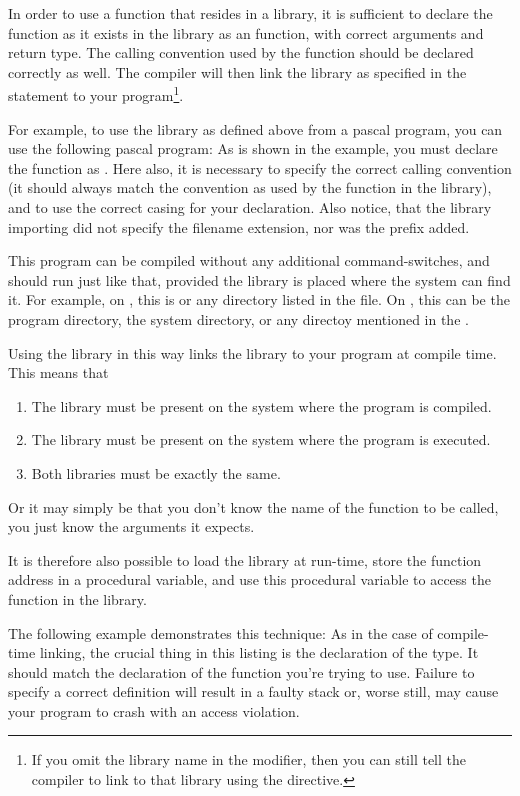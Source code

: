 {In order to use a function that resides in a library, it is sufficient to
declare the function as it exists in the library as an 
function, with correct arguments and return type. The calling convention
used by the function should be declared correctly as well. The compiler
will then link the library as specified in the  statement
to your program\footnote{If you omit the library name in the 
modifier, then you can still tell the compiler to link to that library using
the  directive.}.

For example, to use the library as defined above from a pascal program, you can use
the following pascal program:
As is shown in the example, you must declare the function as .
Here also, it is necessary to specify the correct calling convention (it
should always match the convention as used by the function in the library),
and to use the correct casing for your declaration. Also notice, that
the library importing did not specify the filename extension, nor
was the  prefix added.

This program can be compiled without any additional command-switches,
and should run just like that, provided the library is placed where
the system can find it. For example, on \linux, this is  or any
directory listed in the  file. On \windows, this
can be the program directory, the \windows system directory, or any directoy
mentioned in the .

Using the library in this way links the library to your program at compile
time. This means that
\begin{enumerate}
\item The library must be present on the system where the program is
compiled.
\item The library must be present on the system where the program is
executed.
\item Both libraries must be exactly the same.
\end{enumerate}
Or it may simply be that you don't know the name of the function to
be called, you just know the arguments it expects.

It is therefore also possible to load the library at run-time, store
the function address in a procedural variable, and use this procedural
variable to access the function in the library.

The following example demonstrates this technique:
As in the case of compile-time linking, the crucial thing in this
listing is the declaration of the  type.
It should match the declaration of the function you're trying to use.
Failure to specify a correct definition will result in a faulty stack or,
worse still, may cause your program to crash with an access violation.

}
